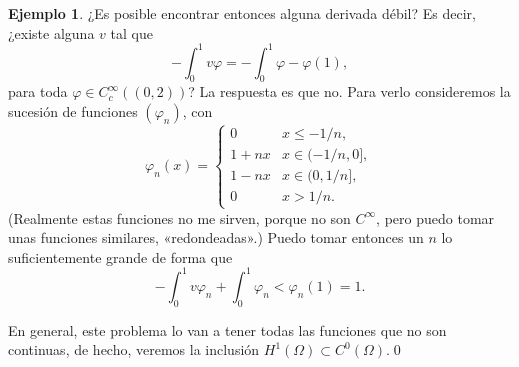 \documentclass[12pt,a4paper]{book}
\theoremstyle{definition} \newtheorem{defn}[thm]{Definición}
\theoremstyle{definition} \newtheorem{ejemplo}[thm]{Ejemplo}
\theoremstyle{definition} \newtheorem{ejercicio}[thm]{Ejercicio}
\theoremstyle{remark} \newtheorem*{obs}{Observación}
\begin{document}
\begin{ejemplo}
    ¿Es posible encontrar entonces alguna derivada débil? Es decir, ¿existe alguna $v$ tal que 
    \begin{equation*}
      -\int_0^1 v \varphi = -\int_0^1 \varphi - \varphi(1),
    \end{equation*}
    para toda $\varphi \in C^{\infty}_c( (0,2))$?
    La respuesta es que no. Para verlo consideremos la sucesión de funciones $(\varphi_n)$, con 
    \begin{equation*}
      \varphi_n (x)=
      \begin{cases}
	0 & x \leq -1/n, \\
      1+nx & x \in (-1/n,0], \\
    1-nx & x \in (0,1/n], \\
    0 & x > 1/n.
      \end{cases}
    \end{equation*}
    (Realmente estas funciones no me sirven, porque no son $C^\infty$, pero puedo tomar unas funciones similares, «redondeadas».) Puedo tomar entonces un $n$ lo suficientemente grande de forma que
    \begin{equation*}
      -\int_0^1 v \varphi_n + \int_0^1 \varphi_n < \varphi_n(1)=1.
    \end{equation*}

    En general, este problema lo van a tener todas las funciones que no son continuas, de hecho, veremos la inclusión $H^1(\Omega) \subset C^0(\Omega)$.\qed
  \end{ejemplo}
\end{document}
